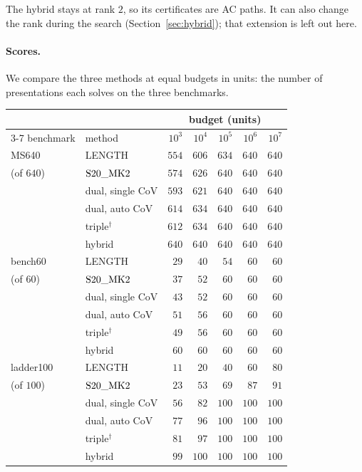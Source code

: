 The hybrid stays at rank $2$, so its certificates are AC paths. It can also change the rank during the search
(Section~\ref{sec:hybrid}); that extension is left out here.

\paragraph{Scores.} We compare the three methods at equal budgets in units: the number of
presentations each solves on the three benchmarks.

\begin{center}
\small
\begin{tabular}{llrrrrr}
\toprule
& & \multicolumn{5}{c}{budget (units)}\\
\cmidrule(lr){3-7}
benchmark & method & $10^3$ & $10^4$ & $10^5$ & $10^6$ & $10^7$\\
\midrule
MS640 & LENGTH & $554$ & $606$ & $634$ & $640$ & $640$\\
(of $640$) & $\mathrm{S20\_MK2}$ & $574$ & $626$ & $640$ & $640$ & $640$\\
& dual, single CoV & $593$ & $621$ & $640$ & $640$ & $640$\\
& dual, auto CoV & $614$ & $634$ & $640$ & $640$ & $640$\\
& triple$^{\dagger}$ & $612$ & $634$ & $640$ & $640$ & $640$\\
& hybrid & $640$ & $640$ & $640$ & $640$ & $640$\\
\midrule
bench60 & LENGTH & $29$ & $40$ & $54$ & $60$ & $60$\\
(of $60$) & $\mathrm{S20\_MK2}$ & $37$ & $52$ & $60$ & $60$ & $60$\\
& dual, single CoV & $43$ & $52$ & $60$ & $60$ & $60$\\
& dual, auto CoV & $51$ & $56$ & $60$ & $60$ & $60$\\
& triple$^{\dagger}$ & $49$ & $56$ & $60$ & $60$ & $60$\\
& hybrid & $60$ & $60$ & $60$ & $60$ & $60$\\
\midrule
ladder100 & LENGTH & $11$ & $20$ & $40$ & $60$ & $80$\\
(of $100$) & $\mathrm{S20\_MK2}$ & $23$ & $53$ & $69$ & $87$ & $91$\\
& dual, single CoV & $56$ & $82$ & $100$ & $100$ & $100$\\
& dual, auto CoV & $77$ & $96$ & $100$ & $100$ & $100$\\
& triple$^{\dagger}$ & $81$ & $97$ & $100$ & $100$ & $100$\\
& hybrid & $99$ & $100$ & $100$ & $100$ & $100$\\
\bottomrule
\end{tabular}


\end{center}
